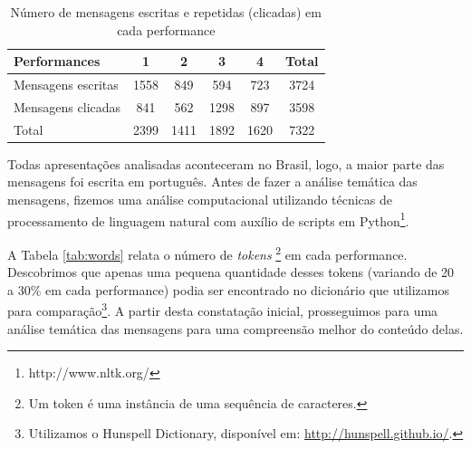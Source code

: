 \begin{table}[ht!]
\caption{Número de mensagens escritas e repetidas (clicadas) em cada performance}{%
\begin{tabular}{@{}lccccc@{}}
\hline
Performances        & 1 & 2 & 3 & 4 & Total \\
\hline
Mensagens escritas &    1558&   849  &  594  &  723 & 3724 \\
Mensagens clicadas &    841 &   562  &  1298 &  897 & 3598 \\
Total &             2399&   1411 &  1892 & 1620 & 7322 \\
\end{tabular}}
\label{tab:msgtype}
\end{table}


Todas apresentações analisadas aconteceram no Brasil, logo, a maior parte das mensagens foi escrita em português. Antes de fazer a análise temática das mensagens, fizemos uma análise computacional utilizando técnicas de processamento de linguagem natural com auxílio de scripts em Python\footnote{http://www.nltk.org/}. 

A Tabela \ref{tab:words} relata o número de \emph{tokens} \footnote{Um token é uma instância de uma sequência de caracteres.} em cada performance. Descobrimos que apenas uma pequena quantidade desses tokens (variando de 20 a 30\% em cada performance) podia ser encontrado no dicionário que utilizamos para comparação\footnote{Utilizamos o Hunspell Dictionary, disponível em: \url{http://hunspell.github.io/}.}. A partir desta constatação inicial, prosseguimos para uma análise temática das mensagens para uma compreensão melhor do conteúdo delas.




